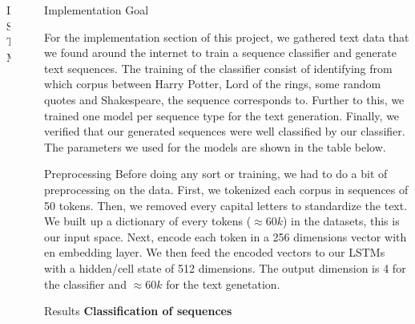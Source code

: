 \documentclass[final]{beamer}
\newlength{\sepwidth}
\newlength{\colwidth}
\newcommand{\separatorcolumn}{\begin{column}{\sepwidth}\end{column}}
\begin{document}
\begin{frame}[t]
\begin{columns}[t]
\begin{column}{\colwidth}
\begin{block}{LSTM}
\end{block}

\end{column}

\separatorcolumn

\begin{column}{\colwidth}

\begin{block}{Implementation Goal}

For the implementation section of this project, we gathered text data that we
found around the internet to train a sequence classifier and generate text
sequences. The training of the classifier consist of identifying from which
corpus between Harry Potter, Lord of the rings, some random quotes and
Shakespeare, the sequence corresponds to. Further to this, we trained one model
per sequence type for the text generation. Finally, we verified that our
generated sequences were well classified by our classifier. The parameters we
used for the models are shown in the table below. 

\end{block}

\begin{block}{Preprocessing}
Before doing any sort or training, we had to do a bit of preprocessing on the
data. First, we tokenized each corpus in sequences of 50 tokens. Then, we
removed every capital letters to standardize the text. We built up a dictionary
of every tokens ($\approx 60k$) in the datasets, this is our input space. Next,
encode each token in a 256 dimensions vector with en embedding layer. We then
feed the encoded vectors to our LSTMs with a hidden/cell state of 512
dimensions. The output dimension is 4 for the classifier and $\approx 60k$ for
the text genetation. 
\end{block}
\begin{block}{Results}
\textbf{Classification of sequences}


\end{block}
\end{column}
\end{columns}
\end{frame}
\end{document}
